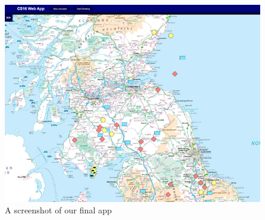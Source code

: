 \begin{figure}[h]
\begin{center}
\includegraphics[width=\textwidth]{images/Picture1.png}
\end{center}
\caption{A screenshot of our final app}
\label{fig:app}
\end{figure}